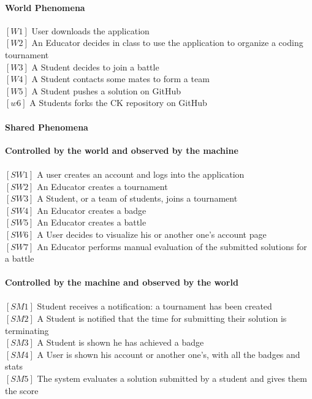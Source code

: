 \documentclass{article}
\begin{document}
            \paragraph{World Phenomena}
            $[W1]$ User downloads the application\\
            $[W2]$ An Educator decides in class to use the application to organize a coding tournament\\
            $[W3]$ A Student decides to join a battle\\
            $[W4]$ A Student contacts some mates to form a team\\
            $[W5]$ A Student pushes a solution on GitHub\\
            $[w6]$ A Students forks the CK repository on GitHub

            \paragraph{Shared Phenomena}
            \textbf{Controlled by the world and observed by the machine} \\\\
            $[SW1]$ A user creates an account and logs into the application\\
            $[SW2]$ An Educator creates a tournament\\
            $[SW3]$ A Student, or a team of students, joins a tournament\\
            $[SW4]$ An Educator creates a badge\\
            $[SW5]$ An Educator creates a battle\\
            $[SW6]$ A User decides to visualize his or another one's account page\\
            $[SW7]$ An Educator performs manual evaluation of the submitted solutions for a battle
\\\\
            \textbf{Controlled by the machine and observed by the world}\\\\
            $[SM1]$ Student receives a notification: a tournament has been created \\
            $[SM2]$ A Student is notified that the time for submitting their solution is terminating\\
            $[SM3]$ A Student is shown he has achieved a badge\\
            $[SM4]$ A User is shown his account or another one's, with all the badges and stats\\
            $[SM5]$ The system evaluates a solution submitted by a student and gives them the score
\end{document}
